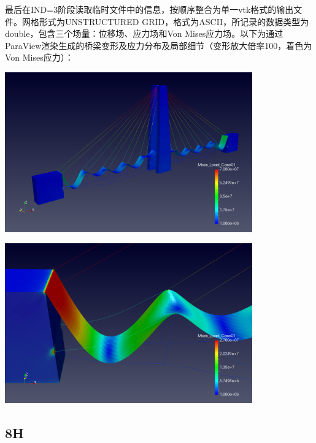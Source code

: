 \documentclass[UTF8]{ctexbook}
\begin{document}
最后在IND=3阶段读取临时文件中的信息，按顺序整合为单一vtk格式的输出文件。网格形式为UNSTRUCTURED GRID，格式为ASCII，所记录的数据类型为double，包含三个场量：位移场、应力场和Von Mises应力场。以下为通过ParaView渲染生成的桥梁变形及应力分布及局部细节（变形放大倍率100，着色为Von Mises应力）：
\begin{center}
\includegraphics[width=0.8\textwidth]{Bridge-3.png}

\includegraphics[width=0.8\textwidth]{Bridge-3-part.png}
\end{center}
\subsection{8H}
\end{document}
